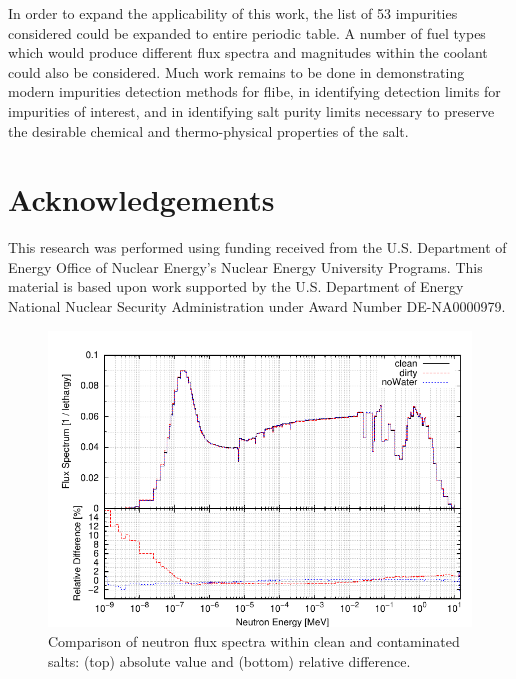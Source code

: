 \documentclass[11pt]{article}
\begin{document}
In order to expand the applicability of this work, the list of 53 impurities considered could be expanded to entire periodic table.
A number of fuel types which would produce different flux spectra and magnitudes within the coolant could also be considered.
Much work remains to be done in demonstrating modern impurities detection methods for flibe, in identifying detection limits for impurities of interest, and in identifying salt purity limits necessary to preserve the desirable chemical and thermo-physical properties of the salt.

\section{Acknowledgements}

This research was performed using funding received from the U.S. Department of Energy Office of Nuclear Energy's Nuclear Energy University Programs.
This material is based upon work supported by the U.S. Department of Energy National Nuclear Security Administration under Award Number DE-NA0000979.

\appendix



\clearpage
\begin{figure}[p]
  \centering
  \includegraphics[width=\textwidth]{./img/fluxSpectra.pdf}
  \caption{Comparison of neutron flux spectra within clean and contaminated salts: (top) absolute value and (bottom) relative difference.}
  \label{fig:fluxSpectra}
\end{figure}
\end{document}
